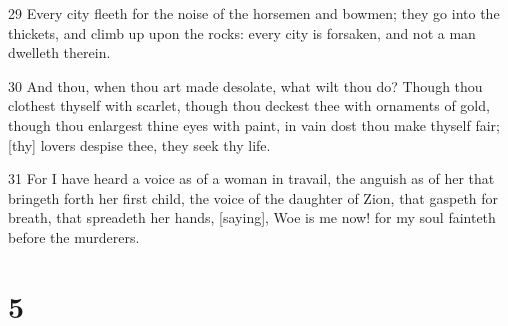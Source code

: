 \par 29 Every city fleeth for the noise of the horsemen and bowmen; they go into the thickets, and climb up upon the rocks: every city is forsaken, and not a man dwelleth therein.
\par 30 And thou, when thou art made desolate, what wilt thou do? Though thou clothest thyself with scarlet, though thou deckest thee with ornaments of gold, though thou enlargest thine eyes with paint, in vain dost thou make thyself fair; [thy] lovers despise thee, they seek thy life.
\par 31 For I have heard a voice as of a woman in travail, the anguish as of her that bringeth forth her first child, the voice of the daughter of Zion, that gaspeth for breath, that spreadeth her hands, [saying], Woe is me now! for my soul fainteth before the murderers.

\chapter{5}

